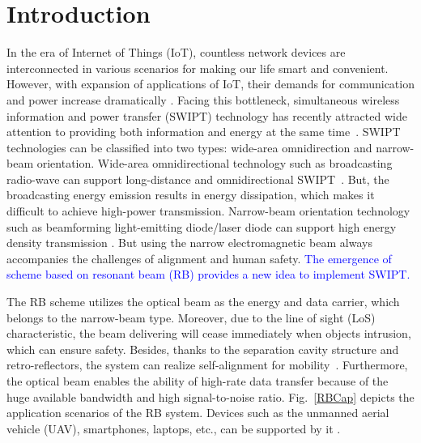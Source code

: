 \documentclass{IEEEtran}
\begin{document}
\section{Introduction}\label{introduction}
In the era of Internet of Things (IoT), countless network devices are interconnected in various scenarios for making our life smart and convenient. 
However, with expansion of applications of IoT, their demands for communication and power increase dramatically \cite{41,7,42,34,51}. Facing this bottleneck, simultaneous wireless information and power transfer (SWIPT) technology has recently attracted wide attention to providing both information and energy at the same time~\cite{huang2013simultaneous}. 
SWIPT technologies can be classified into two types: wide-area omnidirection and narrow-beam orientation. Wide-area omnidirectional technology such as broadcasting radio-wave can support long-distance and omnidirectional SWIPT~\cite{shinohara2014wireless}. But, the broadcasting energy emission results in energy dissipation, which makes it difficult to achieve high-power transmission. Narrow-beam orientation technology such as beamforming light-emitting diode/laser diode can support high energy density transmission \cite{haken1970laser}. But using the narrow electromagnetic beam always accompanies the challenges of alignment and human safety. 
\textcolor{blue}{The emergence of scheme based on resonant beam (RB) provides a new idea to implement SWIPT.}

The RB scheme utilizes the optical beam as the energy and data carrier, which belongs to the narrow-beam type. Moreover, due to the line of sight (LoS) characteristic, the beam delivering will cease immediately when objects intrusion, which can ensure safety. Besides, thanks to the separation cavity structure and retro-reflectors, the system can realize self-alignment for mobility~\cite{9425612}. Furthermore, the optical beam enables the ability of high-rate data transfer because of the huge available bandwidth and high signal-to-noise ratio\cite{khalighi2014survey}. 
Fig.~\ref{RBCap} depicts the application scenarios of the RB system. Devices such as the unmanned aerial vehicle (UAV), smartphones, laptops, etc., can be supported by it \cite{35}. %
\end{document}
